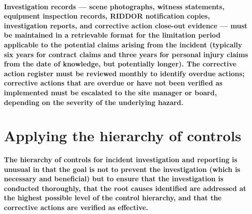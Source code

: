 {\paragraph{Investigation records --- scene photographs, witness statements, equipment inspection records, RIDDOR notification copies, investigation reports, and corrective action close-out evidence --- must be maintained in a retrievable format for the limitation period applicable to the potential claims arising from the incident (typically six years for contract claims and three years for personal injury claims from the date of knowledge, but potentially longer). The corrective action register must be reviewed monthly to identify overdue actions; corrective actions that are overdue or have not been verified as implemented must be escalated to the site manager or board, depending on the severity of the underlying hazard.}


\section{Applying the hierarchy of controls}

\paragraph{The hierarchy of controls for incident investigation and reporting is unusual in that the goal is not to prevent the investigation (which is necessary and beneficial) but to ensure that the investigation is conducted thoroughly, that the root causes identified are addressed at the highest possible level of the control hierarchy, and that the corrective actions are verified as effective.}

}
